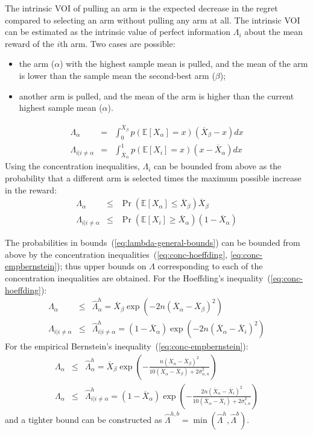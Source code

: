 \documentclass{article}
\newcommand {\IE} {\ensuremath {\mathbb{E}}}
\begin{document}
The intrinsic VOI of pulling an arm is the expected decrease
in the regret compared to selecting an arm without pulling any arm at
all. The intrinsic VOI can be estimated as the intrinsic 
value of perfect information $\Lambda_i$ about the mean reward of the $i$th arm. Two
cases are possible:
\begin{itemize}
\item the arm ($\alpha$) with the highest sample mean is pulled, and the 
mean of the arm is lower than the sample mean the second-best arm ($\beta$);
\item another arm is pulled, and the mean of the arm is higher
than the current highest sample mean ($\alpha$).
\end{itemize}
\begin{eqnarray}
\Lambda_\alpha&=&\int_0^{\overline X_\beta}p(\IE[X_\alpha]=x)(\overline X_\beta-x)dx\nonumber\\
\Lambda_{i|i\ne\alpha}&=&\int_{\overline X_\alpha}^1p(\IE[X_i]=x)(x-\overline X_\alpha)dx
\end{eqnarray}
Using the concentration inequalities, $\Lambda_i$ can be bounded from
above as the probability that a different arm is selected times the
maximum possible increase in the reward:
\begin{eqnarray}
\Lambda_\alpha&\le&\Pr(\IE[X_\alpha]\le\overline X_\beta)\overline X_\beta\nonumber\\
\Lambda_{i|i\ne \alpha}&\le&\Pr(\IE[X_i]\ge\overline
X_\alpha)(1-\overline X_\alpha)
\label{eq:lambda-general-bounds}
\end{eqnarray}

The probabilities in bounds~(\ref{eq:lambda-general-bounds}) can be
bounded from above by the concentration
inequalities~(\ref{eq:conc-hoeffding}, \ref{eq:conc-empbernstein});
thus upper bounds on $\Lambda$ corresponding to each of the
concentration inequalities are obtained. For the Hoeffding's
inequality~(\ref{eq:conc-hoeffding}):
\begin{eqnarray}
\Lambda_\alpha&\le&\hat\Lambda_\alpha^h=\overline X_\beta \exp\left(-2n(\overline  X_\alpha - \overline X_\beta)^2\right)\nonumber\\
\Lambda_{i|i\ne \alpha}&\le&\hat\Lambda_{i|i\ne \alpha}^h=(1-\overline X_\alpha) \exp\left(-2n(\overline X_\alpha - \overline X_i)^2\right)
\label{eq:lambda-hoeffding-bounds}
\end{eqnarray}
For the empirical Bernstein's inequality~(\ref{eq:conc-empbernstein}):
\begin{eqnarray}
\Lambda_\alpha&\le&\hat\Lambda_\alpha^h=\overline X_\beta \exp\left(-\frac {n(\overline X_\alpha - \overline X_\beta)^2} {10(\overline X_\alpha - \overline X_\beta)+2\overline\sigma_{\alpha,n}^2}\right)\nonumber\\
\Lambda_\alpha&\le&\hat\Lambda_{i|i\ne \alpha}^h=(1-\overline X_\alpha) \exp\left(-\frac {2n(\overline X_\alpha - \overline X_i)^2} {10(\overline X_\alpha - \overline X_i)+2\overline\sigma_{i,n}^2}\right)
\label{eq:lambda-bernstein-bounds}
\end{eqnarray}
and a tighter bound can be constructed as $\hat\Lambda^{h,b}=\min(\hat\Lambda^h,\hat\Lambda^b)$.
\end{document}
